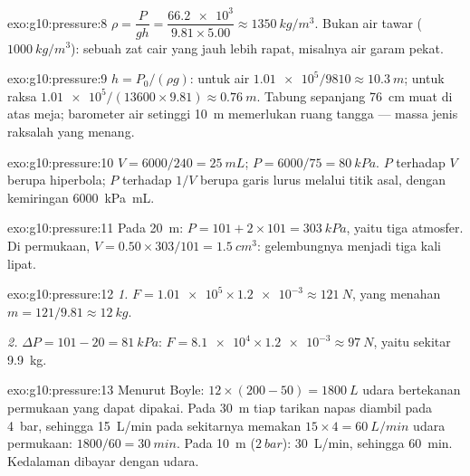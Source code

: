 \begin{solution}{exo:g10:pressure:8}
$\rho = \dfrac{P}{g h} = \dfrac{\num{66.2e3}}{9.81 \times 5.00}
\approx \qty{1350}{kg/m^3}$. Bukan air tawar ($\qty{1000}{kg/m^3}$):
sebuah zat cair yang jauh lebih rapat, misalnya air garam pekat.
\end{solution}

\begin{solution}{exo:g10:pressure:9}
$h = P_0/(\rho g)$: untuk air
$\num{1.01e5}/9810 \approx \qty{10.3}{m}$; untuk raksa
$\num{1.01e5}/(13600 \times 9.81) \approx \qty{0.76}{m}$. Tabung
sepanjang \qty{76}{cm} muat di atas meja; barometer air setinggi
\qty{10}{m} memerlukan ruang tangga --- massa jenis raksalah yang menang.
\end{solution}

\begin{solution}{exo:g10:pressure:10}
$V = 6000/240 = \qty{25}{mL}$; $P = 6000/75 = \qty{80}{kPa}$.
$P$ terhadap $V$ berupa hiperbola; $P$ terhadap $1/V$ berupa garis lurus
melalui titik asal, dengan kemiringan \qty{6000}{kPa.mL}.
\end{solution}

\begin{solution}{exo:g10:pressure:11}
Pada \qty{20}{m}: $P = 101 + 2 \times 101 = \qty{303}{kPa}$, yaitu tiga
atmosfer. Di permukaan,
$V = 0.50 \times 303/101 = \qty{1.5}{cm^3}$: gelembungnya menjadi tiga
kali lipat.
\end{solution}

\begin{solution}{exo:g10:pressure:12}
\emph{1.} $F = \num{1.01e5} \times \num{1.2e-3} \approx \qty{121}{N}$,
yang menahan $m = 121/9.81 \approx \qty{12}{kg}$.

\emph{2.} $\Delta P = 101 - 20 = \qty{81}{kPa}$:
$F = \num{8.1e4} \times \num{1.2e-3} \approx \qty{97}{N}$, yaitu sekitar
\qty{9.9}{kg}.
\end{solution}

\begin{solution}{exo:g10:pressure:13}
Menurut Boyle: $12 \times (200 - 50) = \qty{1800}{L}$ udara bertekanan
permukaan yang dapat dipakai. Pada \qty{30}{m} tiap tarikan napas
diambil pada \qty{4}{bar}, sehingga \qty{15}{L/min} pada 
sekitarnya memakan $15 \times 4 = \qty{60}{L/min}$ udara permukaan:
$1800/60 =
\qty{30}{min}$. Pada \qty{10}{m} ($\qty{2}{bar}$):
\qty{30}{L/min}, sehingga \qty{60}{min}. Kedalaman dibayar dengan udara.
\end{solution}

